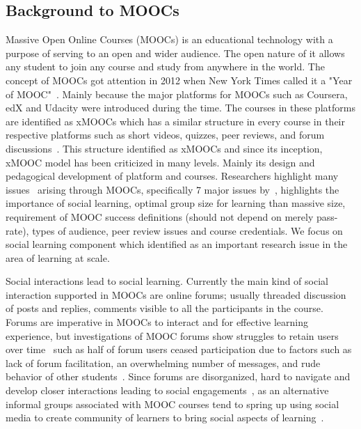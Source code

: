 \documentclass[format=acmsmall, review=false, screen=true]{acmart}
\begin{document}
\subsection{Background to MOOCs}
Massive Open Online Courses (MOOCs) is an educational technology with a purpose of serving to an open and wider audience. The open nature of it allows any student to join any course and study from anywhere in the world. The concept of MOOCs got attention in 2012 when New York Times called it a "Year of MOOC"~\cite{pappano2012year}. Mainly because the major platforms for MOOCs such as Coursera, edX and Udacity were introduced during the time. The courses in these platforms are identified as xMOOCs which has a similar structure in every course in their respective platforms such as short videos, quizzes, peer reviews, and forum discussions~\cite{bali2014mooc}. This structure identified as xMOOCs and since its inception, xMOOC model has been criticized in many levels. Mainly its design and pedagogical development of platform and courses. Researchers highlight many issues~\cite{fournier2015mooc,auyeung2015mooc} arising through MOOCs, specifically 7 major issues by~\cite{scanlon2017learning}, highlights the importance of social learning, optimal group size for learning than massive size, requirement of MOOC success definitions (should not depend on merely pass-rate), types of audience, peer review issues and course credentials. We focus on social learning component which identified as an important research issue in the area of learning at scale. 

Social interactions lead to social learning. Currently the main kind of social interaction supported in MOOCs are online forums; usually threaded discussion of posts and replies, comments visible to all the participants in the course. Forums are imperative in MOOCs to interact and for effective learning experience, but investigations of MOOC forums show struggles to retain users over time~\cite{coetzee2014should} such as half of forum users ceased participation due to factors
such as lack of forum facilitation, an overwhelming number of messages, and rude behavior of other students~\cite{mak2010blogs}. Since forums are disorganized, hard to navigate and develop closer interactions leading to social engagements~\cite{almatrafi2018systematic}, as an alternative informal groups associated with MOOC courses tend to spring up using social media to create community of learners to bring social aspects of learning~\cite{koutsakas2018exploring}. 
\end{document}
